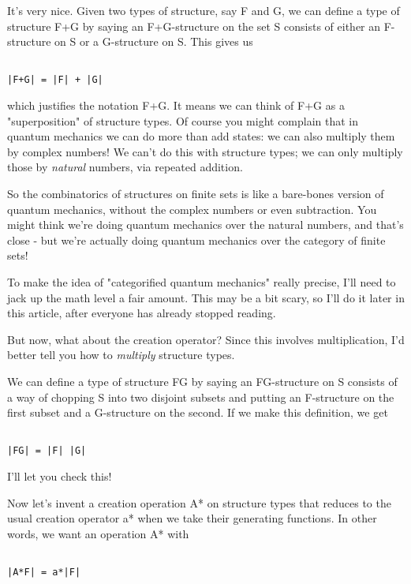 It's very nice.  Given two types of structure, say F and G, we can
define a type of structure F+G by saying an F+G-structure on the set S
consists of either an F-structure on S or a G-structure on S.  This
gives us


\begin{verbatim}

|F+G| = |F| + |G| 
\end{verbatim}
    

which justifies the notation F+G.  It means we can think of F+G as a
"superposition" of structure types.  Of course you might
complain that in quantum mechanics we can do more than add states: we
can also multiply them by complex numbers!  We can't do this with
structure types; we can only multiply those by \emph{natural} numbers, via
repeated addition.

So the combinatorics of structures on finite sets is like a bare-bones
version of quantum mechanics, without the complex numbers or even
subtraction.  You might think we're doing quantum mechanics over the
natural numbers, and that's close - but we're actually doing quantum
mechanics over the category of finite sets!   

To make the idea of "categorified quantum mechanics" really precise,
I'll need to jack up the math level a fair amount.  This may be a bit
scary, so I'll do it later in this article, after everyone has already
stopped reading.

But now, what about the creation operator?  Since this involves
multiplication, I'd better tell you how to \emph{multiply} structure types.

We can define a type of structure FG by saying an FG-structure on S
consists of a way of chopping S into two disjoint subsets and putting an
F-structure on the first subset and a G-structure on the second.  If we
make this definition, we get


\begin{verbatim}

|FG| = |F| |G|
\end{verbatim}
    
I'll let you check this!

Now let's invent a creation operation A* on structure types that reduces
to the usual creation operator a* when we take their generating
functions.  In other words, we want an operation A* with 


\begin{verbatim}

|A*F| = a*|F|
\end{verbatim}
    
